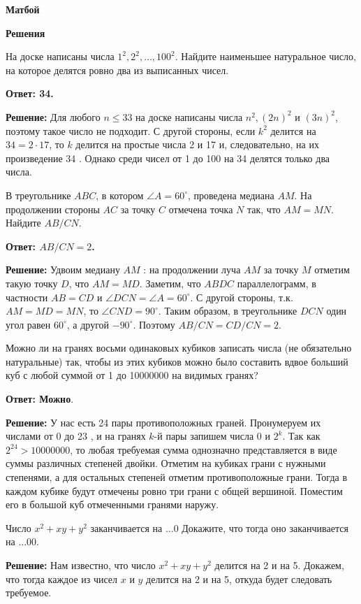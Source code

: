 \centerline{\bf \Huge Матбой}
\centerline{\bf \Huge Решения}

На доске написаны числа $1^2, 2^2, \ldots, 100^2$. Найдите наименьшее натуральное число, на которое делятся ровно два из выписанных чисел.

\textbf{Ответ: 34.}

\textbf{Решение:}
Для любого $n \leqslant 33$ на доске написаны числа $n^2,(2 n)^2$ и $(3 n)^2$, поэтому такое число не подходит. С другой стороны, если $k^2$ делится на $34=2 \cdot 17$, то $k$ делится на простые числа 2 и 17 и, следовательно, на их произведение 34 . Однако среди чисел от 1 до 100 на 34 делятся только два числа.

В треугольнике $A B C$, в котором $\angle A=60^{\circ}$, проведена медиана $A M$. На продолжении стороны $A C$ за точку $C$ отмечена точка $N$ так, что $A M=M N$. Найдите $A B / C N$.

\textbf{Ответ: $A B / C N=2$.}

\textbf{Решение:}
Удвоим медиану $A M$ : на продолжении луча $A M$ за точку $M$ отметим такую точку $D$, что $A M=M D$. Заметим, что $A B D C$ параллелограмм, в частности $A B=C D$ и $\angle D C N=\angle A=60^{\circ}$. С другой стороны, т.к. $A M=M D=M N$, то $\angle C N D=90^{\circ}$. Таким образом, в треугольнике $D C N$ один угол равен $60^{\circ}$, а другой $-90^{\circ}$. Поэтому $A B / C N=C D / C N=2$.

Можно ли на гранях восьми одинаковых кубиков записать числа (не обязательно натуральные) так, чтобы из этих кубиков можно было составить вдвое больший куб с любой суммой от 1 до 10000000 на видимых гранях?

\textbf{Ответ: Можно}.

\textbf{Решение:}
У нас есть 24 пары противоположных граней. Пронумеруем их числами от 0 до 23 , и на гранях $k$-й пары запишем числа 0 и $2^k$. Так как $2^{24}>10000000$, то любая требуемая сумма однозначно представляется в виде суммы различных степеней двойки. Отметим на кубиках грани с нужными степенями, а для остальных степеней отметим противоположные грани. Тогда в каждом кубике будут отмечены ровно три грани с общей вершиной. Поместим его в большой куб отмеченными гранями наружу.

Число $x^2+xy+y^2$ заканчивается на $\ldots0$ Докажите, что тогда оно заканчивается на $\ldots00.$

\textbf{Решение:}
Нам известно, что число $x^2+xy+y^2$ делится на 2 и на 5. Докажем, что тогда каждое из чисел $x$ и $y$ делится на 2 и на 5, откуда будет следовать требуемое.

